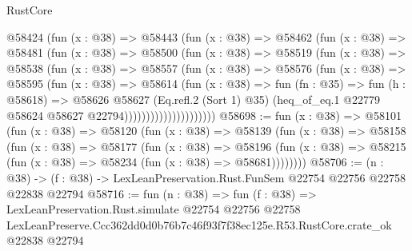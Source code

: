 \begin{lexlean}{RustCore}
\begin{coremodule}
                    @58424
                      (fun (x : @38) =>
                      @58443
                        (fun (x : @38) =>
                        @58462
                          (fun (x : @38) =>
                          @58481
                            (fun (x : @38) =>
                            @58500
                              (fun (x : @38) =>
                              @58519
                                (fun (x : @38) =>
                                @58538
                                  (fun (x : @38) =>
                                  @58557
                                    (fun (x : @38) =>
                                    @58576
                                      (fun (x : @38) =>
                                      @58595
                                        (fun (x : @38) =>
                                        @58614
                                          (fun (x : @38) =>
                                          fun (fn : @35) =>
                                          fun (h : @58618) =>
                                          @58626
                                            @58627
                                            (Eq.refl.{2} (Sort 1) @35)
                                            (heq_of_eq.{1}
                                              @22779
                                              @58624
                                              @58627
                                              @22794)))))))))))))))))))))
@58698 := fun (x : @38) =>
  @58101
    (fun (x : @38) =>
    @58120
      (fun (x : @38) =>
      @58139
        (fun (x : @38) =>
        @58158
          (fun (x : @38) =>
          @58177
            (fun (x : @38) =>
            @58196
              (fun (x : @38) => @58215 (fun (x : @38) => @58234 (fun (x : @38) => @58681))))))))
@58706 := (n : @38) ->
  (f : @38) -> LexLeanPreservation.Rust.FunSem @22754 @22756 @22758 @22838 @22794
@58716 := fun (n : @38) =>
  fun (f : @38) =>
  LexLeanPreservation.Rust.simulate
    @22754
    @22756
    @22758
    LexLeanPreserve.Ccc362dd0d0b76b7c46f93f7f38ec125e.R53.RustCore.crate_ok
    @22838
    @22794
\end{coremodule}
\end{lexlean}
